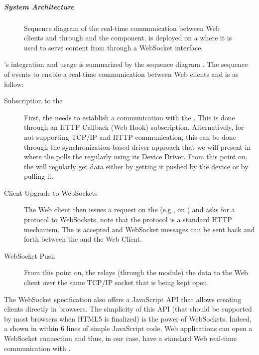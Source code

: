 \subparagraph{System Architecture}
\begin{figure}
\caption{Sequence diagram of the real-time communication between Web clients and \sts{} through \sgs{} and the \tpusher{} component. \tpusher{} is deployed on a \sg{} where it is used to serve content from \sts{} through a WebSocket interface.}
\label{fig:tpusherAndSgs}
\end{figure}
 \tpusher{}'s integration and usage is summarized by the sequence diagram . The sequence of events to enable a real-time communication between Web clients and \sts{} is as follow:
\begin{description}
 \item[\sg{} Subscription to the \stsBig{}] First, the \sg{} needs to establish a communication with the \sts{}. This is done through an HTTP Callback (Web Hook) subscription. Alternatively, for \sts{} not supporting TCP/IP and HTTP communication, this can be done through the synchronization-based driver approach that we will present in  where the \sg{} polls the \sts{} regularly using its Device Driver. From this point on, the \sg{} will regularly get data either by getting it pushed by the device or by pulling it.

 \item[Client Upgrade to WebSockets] The Web client then issues a  request on the \sg{} (e.g., on ) and asks for a protocol  to WebSockets, note that the protocol  is a standard HTTP mechanism. The  is accepted and WebSocket messages can be sent back and forth between the \sg{} and the Web Client.

 \item[WebSocket Push] From this point on, the \sg{} relays (through the \tpusher{} module) the data to the Web client over the same TCP/IP socket that is being kept open.
 \end{description}

The WebSocket specification also offers a JavaScript API that allows creating clients directly in browsers. The simplicity of this API (that should be supported by most browsers when HTML5 is finalized) is the power of WebSockets. Indeed, a shown in  within 6 lines of simple JavaScript code, Web applications can open a WebSocket connection and thus, in our case, have a standard Web real-time communication with \sts{}.

